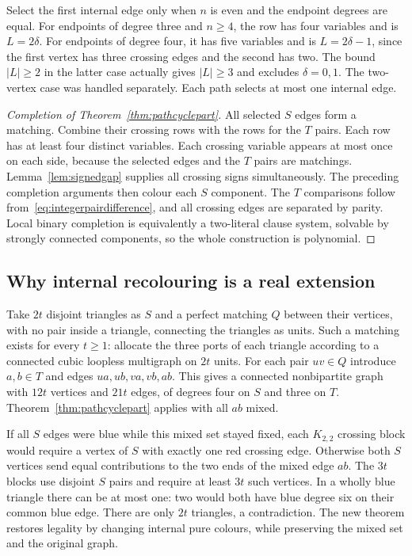 Select the first internal edge only when $n$ is even and the endpoint
degrees are equal. For endpoints of degree three and $n\ge4$, the row
has four variables and is $L=2\delta$. For endpoints of degree four,
it has five variables and is $L=2\delta-1$, since the first vertex has
three crossing edges and the second has two. The bound $|L|\ge2$ in
the latter case actually gives $|L|\ge3$ and excludes $\delta=0,1$.
The two-vertex case was handled separately. Each path selects at most
one internal edge.

\begin{proof}[Completion of Theorem~\ref{thm:pathcyclepart}]
All selected $S$ edges form a matching. Combine their crossing rows
with the rows for the $T$ pairs. Each row has at least four distinct
variables. Each crossing variable appears at most once on each side,
because the selected edges and the $T$ pairs are matchings.
Lemma~\ref{lem:signedgap} supplies all crossing signs simultaneously.
The preceding completion arguments then colour each $S$ component.
The $T$ comparisons follow from~\eqref{eq:integerpairdifference}, and
all crossing edges are separated by parity. Local binary completion is
equivalently a two-literal clause system, solvable by strongly connected
components, so the whole construction is polynomial.
\end{proof}

\subsection{Why internal recolouring is a real extension}

Take $2t$ disjoint triangles as $S$ and a perfect matching $Q$ between
their vertices, with no pair inside a triangle, connecting the triangles
as units. Such a matching exists for every $t\ge1$: allocate the three
ports of each triangle according to a connected cubic loopless
multigraph on $2t$ units. For each pair $uv\in Q$ introduce $a,b\in T$
and edges $ua,ub,va,vb,ab$. This gives a connected nonbipartite graph
with $12t$ vertices and $21t$ edges, of degrees four on $S$ and three
on $T$. Theorem~\ref{thm:pathcyclepart} applies with all $ab$ mixed.

If all $S$ edges were blue while this mixed set stayed fixed, each
$K_{2,2}$ crossing block would require a vertex of $S$ with exactly one
red crossing edge. Otherwise both $S$ vertices send equal contributions
to the two ends of the mixed edge $ab$. The $3t$ blocks use disjoint
$S$ pairs and require at least $3t$ such vertices. In a wholly blue
triangle there can be at most one: two would both have blue degree six
on their common blue edge. There are only $2t$ triangles, a contradiction.
The new theorem restores legality by changing internal pure colours,
while preserving the mixed set and the original graph.

